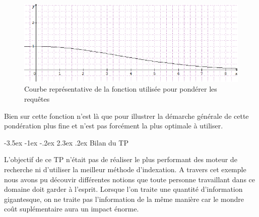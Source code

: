 \documentclass[a4paper,12pt]{article}
\makeatletter
\renewcommand\section{\@startsection {section}{1}{\z@}%
                           {-3.5ex \@plus -1ex \@minus -.2ex}%
                           {2.3ex \@plus.2ex}%
                           {\normalfont\Large\bfseries}}
\makeatother
\begin{document}
\begin{figure}[H]
	\center
	\includegraphics{courbe.png}
	\caption{Courbe représentative de la fonction utilisée pour pondérer les requêtes}
\end{figure}

Bien sur cette fonction n'est là que pour illustrer la démarche générale de cette pondération plus fine et n'est pas forcément la plus optimale à utiliser.

\section{Bilan du TP}

L'objectif de ce TP n'était pas de réaliser le plus performant des moteur de recherche ni d'utiliser la meilleur méthode d'indexation. A travers cet exemple nous avons pu découvir différentes notions
que toute personne travaillant dans ce domaine doit garder à l'esprit. Lorsque l'on traite une quantité d'information gigantesque, on ne traite pas l'information de la même manière car le mondre coût suplémentaire
aura un impact énorme.
\end{document}
